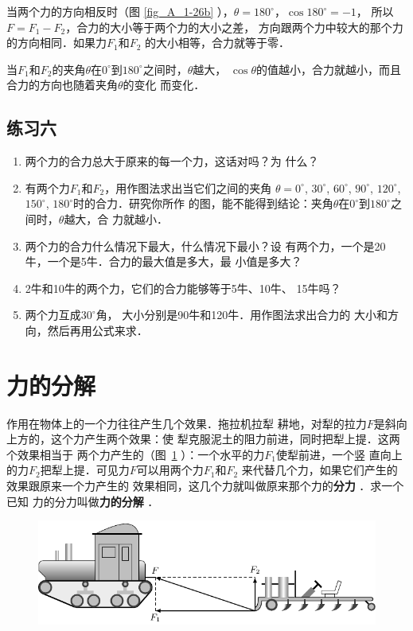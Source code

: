     当两个力的方向相反时（图 \ref{fig_A_1-26b} ），$\theta =180^\circ$，$\cos 180^\circ=-1$，
所以$F=F_1-F_2$，合力的大小等于两个力的大小之差，
方向跟两个力中较大的那个力的方向相同．如果力$F_1$和$F_2$
的大小相等，合力就等于零．

    当$F_1$和$F_2$的夹角$\theta$在$0^\circ$到$180^\circ$之间时，$\theta$越大，
$\cos\theta$的值越小，合力就越小，而且合力的方向也随着夹角$\theta$的变化
而变化．


\subsection*{练习六} 
\begin{enumerate} 
\item 两个力的合力总大于原来的每一个力，这话对吗？为
什么？

\item 有两个力$F_1$和$F_2$，用作图法求出当它们之间的夹角
$\theta =0^\circ$, $30^\circ$, $60^\circ$, $90^\circ$, $120^\circ$, $150^\circ$, $180^\circ$时的合力．研究你所作
的图，能不能得到结论：夹角$\theta$在$0^\circ$到$180^\circ$之间时，$\theta $越大，合
力就越小．
\item 两个力的合力什么情况下最大，什么情况下最小？设
有两个力，一个是20牛，一个是5牛．合力的最大值是多大，最
小值是多大？
\item 2牛和10牛的两个力，它们的合力能够等于5牛、10牛、
15牛吗？
\item   两个力互成$30^\circ$角， 大小分别是90牛和120牛．用作图法求出合力的
大小和方向，然后再用公式来求．
\end{enumerate} 
    
\section{力的分解} 
作用在物体上的一个力往往产生几个效果．拖拉机拉犁
耕地，对犁的拉力$F$是斜向上方的，这个力产生两个效果：使
犁克服泥土的阻力前进，同时把犁上提．这两个效果相当于
两个力产生的（图~\ref{fig_A_1-27} ）：一个水平的力$F_1$使犁前进，一个竖
直向上的力$F_2$把犁上提．可见力$F$可以用两个力$F_1$和$F_2$
来代替几个力，如果它们产生的效果跟原来一个力产生的
效果相同，这几个力就叫做原来那个力的\textbf{分力} ．求一个已知
力的分力叫做\textbf{力的分解} ．

\begin{figure} [htp]\centering
\includegraphics{fig/A/1-27.pdf} 
\caption{} \label{fig_A_1-27} 
\end{figure} 

